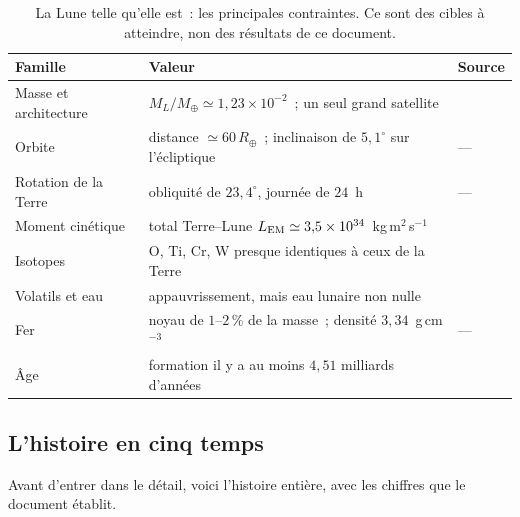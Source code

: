 \documentclass[11pt,a4paper]{article}
\newcommand{\Rt}{\ensuremath{R_\oplus}}
\newcommand{\Mt}{\ensuremath{M_\oplus}}
\newcommand{\LEM}{\ensuremath{L_{\rm EM}}}
\begin{document}
\begin{table}[htbp]
\centering
\caption{La Lune telle qu'elle est~: les principales contraintes. Ce sont des cibles à atteindre, non des résultats de ce document.\label{tab:contraintes}}
\small
\begin{tabular}{>{\raggedright\arraybackslash}p{3.2cm}>{\raggedright\arraybackslash}p{7.6cm}>{\raggedright\arraybackslash}p{4.2cm}}
\toprule
Famille & Valeur & Source \\
\midrule
Masse et architecture & $M_L/\Mt\simeq1{,}23\times10^{-2}$~; un seul grand satellite & \citep{Williams2014} \\
Orbite & distance $\simeq60\,\Rt$~; inclinaison de $5{,}1^\circ$ sur l'écliptique & --- \\
Rotation de la Terre & obliquité de $23{,}4^\circ$, journée de $24$~h & --- \\
Moment cinétique & total Terre--Lune $\LEM\simeq3{,}5\times10^{34}$~kg\,m$^2$\,s$^{-1}$ & \citep{Canup2004,CanupAsphaug2001} \\
Isotopes & O, Ti, Cr, W presque identiques à ceux de la Terre & \citep{Young2016,Zhang2012,Dauphas2017,Kruijer2015,Touboul2015} \\
Volatils et eau & appauvrissement, mais eau lunaire non nulle & \citep{Saal2008,Saal2013,Hauri2011} \\
Fer & noyau de $1$--$2\,\%$ de la masse~; densité $3{,}34$~g\,cm$^{-3}$ & --- \\
Âge & formation il y a au moins $4{,}51$ milliards d'années & \citep{Barboni2017} \\
\bottomrule
\end{tabular}
\end{table}

\subsection{L'histoire en cinq temps}

Avant d'entrer dans le détail, voici l'histoire entière, avec les chiffres que le document établit.
\end{document}
